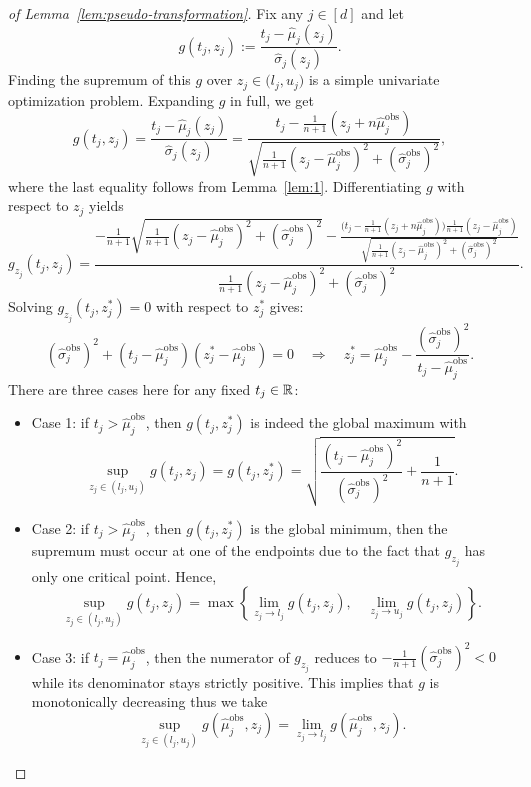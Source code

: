 \begin{proof}[of Lemma~\ref{lem:pseudo-transformation}]
Fix any $j\in [d]$ and let
\[
g(t_j, z_j) := \frac{t_j - \hat{\mu}_{j}(z_j)}{\hat{\sigma}_{j}(z_j)}.
\]
Finding the supremum of this $g$ over $z_j\in \mathcal (l_j, u_j)$ is a simple univariate optimization problem. Expanding $g$ in full, we get
\begin{equation}\label{eq:coordinate-wise-transformation}
    g(t_j, z_j) = \frac{t_j - \hat{\mu}_{j}(z_j)}{\hat{\sigma}_{j}(z_j)} = \frac{t_j-\frac{1}{n+1}(z_j+n\hat{\mu}^\mathrm{obs}_j)}{\sqrt{\frac{1}{n+1}(z_j-\hat{\mu}^\mathrm{obs}_j)^2+(\hat{\sigma}^\mathrm{obs}_j)^2}},
\end{equation}
where the last equality follows from Lemma~\ref{lem:1}. 
Differentiating $g$ with respect to $z_j$ yields
\[
g_{z_j}(t_j, z_j) = 
\frac{
-\tfrac{1}{n+1}\sqrt{\frac{1}{n+1}(z_j-\hat{\mu}^\mathrm{obs}_j)^2+(\hat{\sigma}^\mathrm{obs}_j)^2}
- \tfrac{\big(t_j - \tfrac{1}{n+1}(z_j+n\hat{\mu}^\mathrm{obs}_j)\big)\tfrac{1}{n+1}(z_j-\hat{\mu}^\mathrm{obs}_j)}{\sqrt{\frac{1}{n+1}(z_j-\hat{\mu}^\mathrm{obs}_j)^2+(\hat{\sigma}^\mathrm{obs}_j)^2}}
}
{\frac{1}{n+1}(z_j-\hat{\mu}^\mathrm{obs}_j)^2+(\hat{\sigma}^\mathrm{obs}_j)^2}.
\]
Solving $g_{z_j}(t_j,z^*_j)=0$ with respect to $z^*_j$ gives:
\[
(\hat{\sigma}^\mathrm{obs}_j)^2 + (t_j-\hat{\mu}^\mathrm{obs}_j)(z^*_j-\hat{\mu}^\mathrm{obs}_j)=0
\quad\Longrightarrow\quad
z^\ast_j = \hat{\mu}^\mathrm{obs}_j - \frac{(\hat{\sigma}^\mathrm{obs}_j)^2}{t_j-\hat{\mu}^\mathrm{obs}_j}.
\]
There are three cases here for any fixed $t_j \in \mathbb{R}$:
\begin{itemize}
    \item Case 1: if $t_j > \hat{\mu}^\mathrm{obs}_j$, then $g(t_j, z^\ast_j)$ is indeed the global maximum with
    \[
    \sup_{z_j \in (l_j, u_j)} g(t_j, z_j) = g(t_j, z^\ast_j) = \sqrt{\frac{(t_j-\hat{\mu}^\mathrm{obs}_j)^2}{(\hat{\sigma}^\mathrm{obs}_j)^2}+\frac{1}{n+1}}.
    \]
    \item Case 2: if $t_j > \hat{\mu}^\mathrm{obs}_j$, then $g(t_j, z^\ast_j)$ is  the global minimum, then the supremum must occur at one of the endpoints due to the fact that $g_{z_j}$ has only one critical point. Hence,
    \[
    \sup_{z_j \in (l_j, u_j)} g(t_j, z_j) = \max\left\{\lim_{z_j \rightarrow l_j}g(t_j,z_j), \quad \lim_{z_j \rightarrow u_j}g(t_j,z_j)\right\}.
    \]
    \item Case 3: if $t_j = \hat{\mu}^\mathrm{obs}_j$, then the numerator of $g_{z_j}$ reduces to $-\tfrac{1}{n+1}(\hat{\sigma}^\mathrm{obs}_j)^2 < 0$ while its denominator stays strictly positive. This implies that $g$ is monotonically decreasing thus we take
    \[
    \sup_{z_j \in (l_j, u_j)} g(\hat{\mu}^\mathrm{obs}_j, z_j) = \lim_{z_j \rightarrow l_j} g(\hat{\mu}^\mathrm{obs}_j, z_j).
    \]
\end{itemize}


\end{proof}

